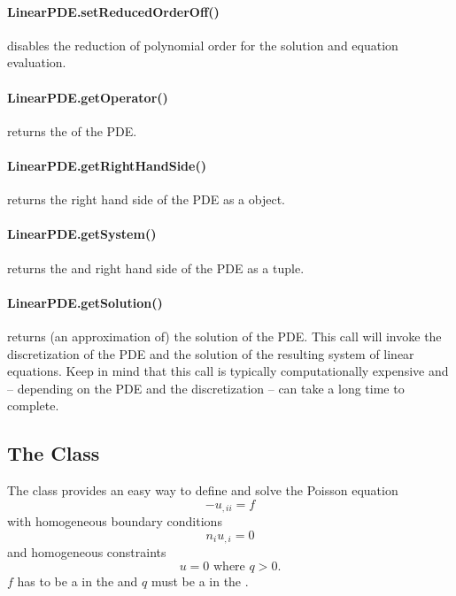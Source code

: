 \paragraph{LinearPDE.setReducedOrderOff()}
disables the reduction of polynomial order for the solution and equation evaluation.


\paragraph{LinearPDE.getOperator()}
returns the \Operator of the PDE.


\paragraph{LinearPDE.getRightHandSide()}
returns the right hand side of the PDE as a \Data object.


\paragraph{LinearPDE.getSystem()}
returns the \Operator and right hand side of the PDE as a tuple.


\paragraph{LinearPDE.getSolution()}
returns (an approximation of) the solution of the PDE. This call will invoke
the discretization of the PDE and the solution of the resulting system of
linear equations. Keep in mind that this call is typically computationally
expensive and -- depending on the PDE and the discretization -- can take a
long time to complete.


\subsection{The \Poisson Class}
The \Poisson class provides an easy way to define and solve the Poisson
equation
\begin{equation}\label{POISSON.1}
-u_{,ii}=f
\end{equation}
with homogeneous boundary conditions
\begin{equation}\label{POISSON.2}
n_{i}u_{,i}=0
\end{equation}
and homogeneous constraints
\begin{equation}\label{POISSON.3}
u=0 \mbox{ where } q>0 .
\end{equation}
$f$ has to be a \Scalar in the \Function and $q$ must be a \Scalar in the \SolutionFS.

